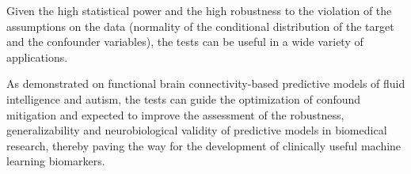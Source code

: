 \documentclass{article}
\begin{document}
Given the high statistical power and the high robustness to the violation of the assumptions on the data (normality of the conditional distribution of the target and the confounder variables), the tests can be useful in a wide variety of applications.

As demonstrated on functional brain connectivity-based predictive models of fluid intelligence and autism, the tests can guide the optimization of confound mitigation and expected to improve the assessment of the robustness, generalizability and neurobiological validity of predictive models in biomedical research, thereby paving the way for the development of clinically useful machine learning biomarkers.

  


\newpage

\end{document}
